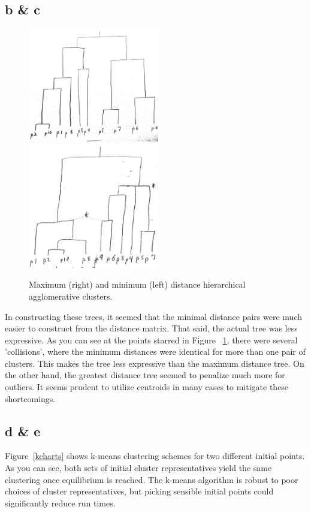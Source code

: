 \documentclass[12pt]{article}
\begin{document}
\subsection*{b \& c}

\begin{figure}
\centering
\includegraphics[width=2.25in]{maxtree.jpg}
\hspace{1cm}
\includegraphics[width=2.25in]{mintree.jpg}
\caption{Maximum (right) and minimum (left) distance hierarchical agglomerative clusters.}
\label{trees}
\end{figure}
In constructing these trees, it seemed that the minimal distance pairs were much easier to construct from the distance matrix.  That said, the actual tree was less expressive.  As you can see at the points starred in Figure ~\ref{trees}, there were several 'collisions', where the minimum distances were identical for more than one pair of clusters.  This makes the tree less expressive than the maximum distance tree.  On the other hand, the greatest distance tree seemed to penalize much more for outliers.  It seems prudent to utilize centroids in many cases to mitigate these shortcomings.

\subsection*{d \& e}  Figure~\ref{kcharts} shows k-means clustering schemes for two different initial points.  As you can see, both sets of initial cluster representatives yield the same clustering once equilibrium is reached.  The k-means algorithm is robust to poor choices of cluster representatives, but picking sensible initial points could significantly reduce run times.
\end{document}
